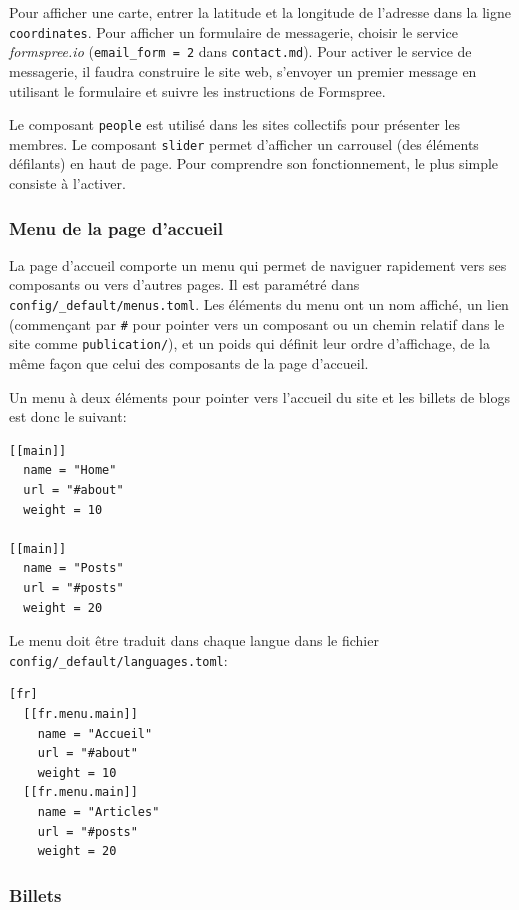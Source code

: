 \documentclass[
  12pt,
  french,
  a4paper,
  extrafontsizes,onecolumn,openright
  ]{memoir}
\begin{document}
Pour afficher une carte, entrer la latitude et la longitude de l'adresse dans la ligne \texttt{coordinates}.
Pour afficher un formulaire de messagerie, choisir le service \emph{formspree.io} (\texttt{email\_form\ =\ 2} dans \texttt{contact.md}).
Pour activer le service de messagerie, il faudra construire le site web, s'envoyer un premier message en utilisant le formulaire et suivre les instructions de Formspree.

Le composant \texttt{people} est utilisé dans les sites collectifs pour présenter les membres.
Le composant \texttt{slider} permet d'afficher un carrousel (des éléments défilants) en haut de page.
Pour comprendre son fonctionnement, le plus simple consiste à l'activer.

\hypertarget{menu-de-la-page-daccueil}{%
\subsubsection{Menu de la page d'accueil}\label{menu-de-la-page-daccueil}}

La page d'accueil comporte un menu qui permet de naviguer rapidement vers ses composants ou vers d'autres pages.
Il est paramétré dans \texttt{config/\_default}\break\texttt{/menus.toml}.
Les éléments du menu ont un nom affiché, un lien (commençant par \texttt{\#} pour pointer vers un composant ou un chemin relatif dans le site comme \texttt{publication/}), et un poids qui définit leur ordre d'affichage, de la même façon que celui des composants de la page d'accueil.

Un menu à deux éléments pour pointer vers l'accueil du site et les billets de blogs est donc le suivant:

\begin{verbatim}
[[main]]
  name = "Home"
  url = "#about"
  weight = 10

[[main]]
  name = "Posts"
  url = "#posts"
  weight = 20
\end{verbatim}

Le menu doit être traduit dans chaque langue dans le fichier \texttt{config/\_default}\break\texttt{/languages.toml}:

\begin{verbatim}
[fr]
  [[fr.menu.main]]
    name = "Accueil"
    url = "#about"
    weight = 10
  [[fr.menu.main]]
    name = "Articles"
    url = "#posts"
    weight = 20
\end{verbatim}

\hypertarget{billets}{%
\subsubsection{Billets}\label{billets}}
\end{document}
